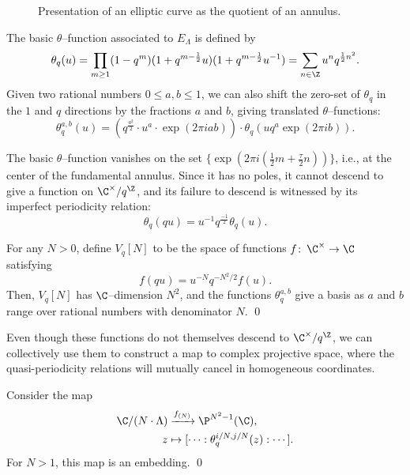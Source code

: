 \begin{figure}
\begin{center}
\end{center}
\caption{Presentation of an elliptic curve as the quotient of an annulus.}\label{AnnulusPicture}
\end{figure}

\begin{definition}
The basic $\theta$--function associated to $E_\Lambda$ is defined by \[\theta_q(u) = \prod_{m \ge 1} (1 - q^m) (1 + q^{m-\frac{1}{2}}u) (1 + q^{m-\frac{1}{2}}u^{-1}) = \sum_{n \in \Z} u^n q^{\frac{1}{2} n^2}.\]  Given two rational numbers $0 \le a, b \le 1$, we can also shift the zero-set of $\theta_q$ in the $1$ and $q$ directions by the fractions $a$ and $b$, giving translated $\theta$--functions: \[\theta_q^{a,b}(u) = \left(q^{\frac{a^2}{2}} \cdot u^a \cdot \exp(2 \pi i a b) \right) \cdot \theta_q(u q^a \exp(2 \pi i b)).\]
\end{definition}

The basic $\theta$--function vanishes on the set $\{\exp(2 \pi i (\frac{1}{2}m + \frac{\tau}{2}n))\}$, i.e., at the center of the fundamental annulus.  Since it has no poles, it cannot descend to give a function on $\C^\times / q^{\Z}$, and its failure to descend is witnessed by its imperfect periodicity relation: \[\theta_q(qu) = u^{-1} q^{\frac{-1}{2}} \theta_q(u).\]

\begin{lemma}
For any $N > 0$, define $V_q[N]$ to be the space of functions $f\co \C^\times \to \C$ satisfying \[f(q u) = u^{-N}  q^{-N^2/2} f(u).\]  Then, $V_q[N]$ has $\C$--dimension $N^2$, and the functions $\theta_q^{a, b}$ give a basis as $a$ and $b$ range over rational numbers with denominator $N$. \qed
\end{lemma}

Even though these functions do not themselves descend to $\C^\times / q^{\Z}$, we can collectively use them to construct a map to complex projective space, where the quasi-periodicity relations will mutually cancel in homogeneous coordinates.
\begin{theorem}
Consider the map
\begin{align*}
\C / (N \cdot \Lambda) & \xrightarrow{f_{(N)}} \P^{N^2-1}(\C), \\
z & \mapsto [\cdots : \theta_q^{i/N, j/N}(z) : \cdots].
\end{align*}
For $N > 1$, this map is an embedding. \qed
\end{theorem}

